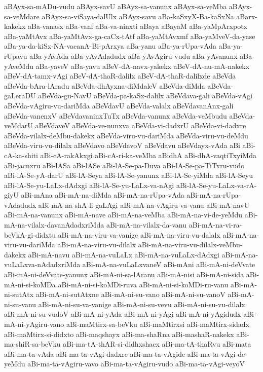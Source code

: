 {aBAyx-sa-mADu-vudu
aBAyx-savU
aBAyx-sa-vanunx
aBAyx-sa-veMba
aBAyx-sa-veMdare
aBAyx-sa-viSaya-dalUlx
aBAyx-savu
aBa-kaSxyX-Ba-kaSxNa
aBarx-kakekx
aBa-vanasx
aBa-vanf
aBa-va-ninxti
aBaya
aBayaM
aBa-yaMpArxpotx
aBa-yaMtAvx
aBa-yaMtAvx-ga-caCx-tAtf
aBa-yaMtAvxmf
aBa-yaMveV-da-yase
aBa-ya-da-kiSx-NA-vacanA-Bi-pArxya
aBa-yanu
aBa-ya-rUpa-vAda
aBa-ya-rUpavu
aBa-yAvAda
aBa-yAvAdadudx
aBa-yAvAgiru-vudu
aBa-yAvanunx
aBa-yAveMdu
aBa-yaveV
aBa-yavu
aBeV-dA-navx-yakekx
aBeV-dA-nu-mA-nakekx
aBeV-dA-tamx-vAgi
aBeV-dA-thaR-dalilx
aBeV-dA-thaR-dalilxde
aBeVda
aBeVda-bAra-lAradu
aBeVda-dhAyxna-diMdaleV
aBeVda-diMda
aBeVda-gaLeraDU
aBeVda-gu-NavU
aBeVda-pa-kaSx-dalilx
aBeVdava-gali
aBeVda-vAgi
aBeVda-vAgiru-vu-dariMda
aBeVdavU
aBeVda-valalx
aBeVdavanAnx-gali
aBeVda-vanenxV
aBeVdavaninxTuTx
aBeVda-vanunx
aBeVda-veMbudu
aBeVda-veMdarU
aBeVdaveV
aBeVda-ve-nunxva
aBeVda-vi-dadxrU
aBeVda-vi-dadxre
aBeVda-vilalx-deMbu-dakekx
aBeVda-viru-vu-dariMda
aBeVda-viru-vu-deMdu
aBeVda-viru-vu-dilalx
aBeVdavo
aBeVdavoV
aBeVdavu
aBeVdayx-vAda
aBi
aBi-cA-ka-shiti
aBi-cA-rakAkxgi
aBi-cA-ri-ka-veMba
aBidhA
aBi-dhA-vaqtiTxyiMda
aBi-jacnxru
aBi-lASa
aBi-lASe
aBi-lA-Se-pa-Duva
aBi-lA-Se-pa-TiTxru-vudo
aBi-lA-Se-yA-darU
aBi-lA-Seya
aBi-lA-Se-yanunx
aBi-lA-Se-yiMda
aBi-lA-Seyu
aBi-lA-Se-yu-LaLx-dAdxgi
aBi-lA-Se-yu-LaLx-va-nAgi
aBi-lA-Se-yu-LaLx-va-rA-giyU
aBi-mAna
aBi-mA-na-diMda
aBi-mA-na-rUpa-vAda
aBi-mA-na-rUpa-vAdadudx
aBi-mA-na-shA-li-gaLAgi
aBi-mA-na-vAgiru-va-vanu
aBi-mA-navU
aBi-mA-na-vanunx
aBi-mA-nave
aBi-mA-na-veMba
aBi-mA-na-vi-de-yeMdu
aBi-mA-na-vilalx-davanAdadxriMda
aBi-mA-na-vilalx-da-vanu
aBi-mA-na-vi-ra-beVkA-gi-didxtu
aBi-mA-na-viru-va-vanige
aBi-mA-na-viru-vu-dalalx
aBi-mA-na-viru-vu-dariMda
aBi-mA-na-viru-vu-dilalx
aBi-mA-na-viru-vu-dilalx-veMbu-dakekx
aBi-mA-navu
aBi-mA-na-vuLaLx
aBi-mA-na-vuLaLx-dAdxgi
aBi-mA-na-vuLaLxva-nAdadxriMda
aBi-mA-na-vuLaLxvaneV
aBi-mAni
aBi-mA-ni-deVvate
aBi-mA-ni-deVvate-yanunx
aBi-mA-ni-sa-lAranu
aBi-mA-nisi
aBi-mA-ni-sida
aBi-mA-ni-si-koMDa
aBi-mA-ni-si-koMDi-ruva
aBi-mA-ni-si-koMDi-ru-vanu
aBi-mA-ni-sutAtx
aBi-mA-ni-sutAtxne
aBi-mA-ni-su-vano
aBi-mA-ni-su-vanoV
aBi-mA-ni-su-vanu
aBi-mA-ni-su-va-vanige
aBi-mA-ni-su-vevu
aBi-mA-ni-su-vu-dilalx
aBi-mA-ni-su-vudoV
aBi-mA-ni-yAda
aBi-mA-ni-yAgi
aBi-mA-ni-yAgidudx
aBi-mA-ni-yAgiru-vano
aBi-maMtirx-sa-beVku
aBi-maMtirxsi
aBi-maMtirx-sidadx
aBi-maMtirx-si-didxto
aBi-maqshayx
aBi-ma-shaRna
aBi-mashaR-nakekx
aBi-ma-shiR-sa-beVku
aBi-ma-tA-thAR-si-didhxshacx
aBi-ma-tA-thaRvu
aBi-mata
aBi-ma-ta-vAda
aBi-ma-ta-vAgi-dadxre
aBi-ma-ta-vAgide
aBi-ma-ta-vAgi-de-yeMdu
aBi-ma-ta-vAgiru-vavo
aBi-ma-ta-vAgiru-vudo
aBi-ma-ta-vAgi-veyoV
}
